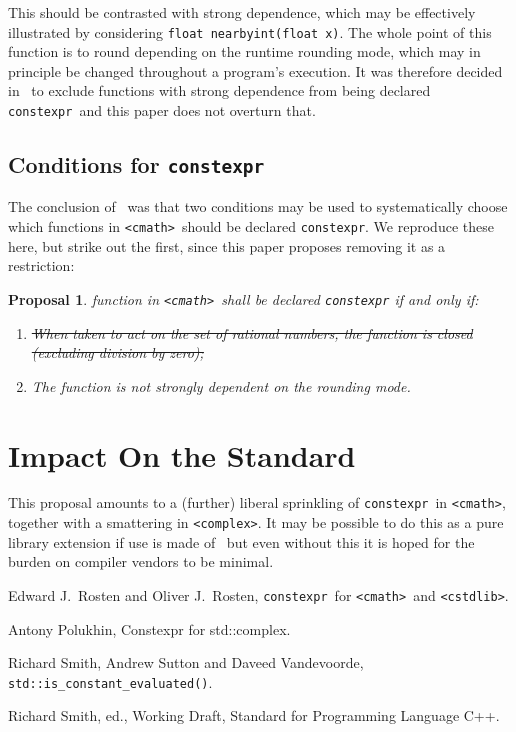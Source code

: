 \documentclass[prd,twocolumn,amsmath,amssymb,nofootinbib,eqsecnum]{revtex4-1}
\newcommand{\constexpr}{\code{constexpr}\xspace}
\newcommand{\code}[1]{{\tt #1}}
\newcommand{\header}[1]{{\tt <#1>}}
\newcommand{\cmath}{\header{cmath}}
\newcommand{\complex}{\header{complex}}
\newcommand{\cstdlib}{\header{cstdlib}}
\newtheorem*{proposal*}{Proposal}
\begin{document}
This should be contrasted with strong dependence, which may be effectively illustrated by considering \code{float nearbyint(float x)}. The whole point of this function is to round depending on the runtime rounding mode, which may in principle be changed throughout a program's execution. It was therefore decided in~\cite{Rosten-constexpr} to exclude functions with strong dependence from being declared \constexpr\ and this paper does not overturn that.

\subsection{Conditions for \constexpr}

The conclusion of~\cite{Rosten-constexpr} was that two conditions may be used to systematically choose which functions in \cmath\ should be declared \constexpr. We reproduce these here, but strike out the first, since this paper proposes removing it as a restriction:

\begin{proposal*}
	function in \cmath\ shall be declared \constexpr if and only if:
	\begin{enumerate}
		\item \st{When taken to act on the set of rational numbers, the function is closed (excluding division 
		by zero);}
		
		\item The function is not strongly dependent on the rounding mode.
	\end{enumerate}
\end{proposal*}





\section{Impact On the Standard}

This proposal amounts to a (further) liberal sprinkling of \constexpr\ in \cmath, together with a smattering in \complex. It may be possible to do this as a pure library extension if use is made of~\cite{ConstEval} but even without this it is hoped for the burden on compiler vendors to be minimal.





\begin{thebibliography}{1}
	 Edward J.~Rosten and Oliver J.~Rosten, \constexpr\ for \cmath\ and \cstdlib.

	 Antony Polukhin, Constexpr for std::complex.	
	
	 Richard Smith, Andrew Sutton and Daveed Vandevoorde, \code{std\!::\!is\_constant\_evaluated()}.
	
	 Richard Smith, ed., Working Draft, Standard for Programming Language C++.	
\end{thebibliography}
\end{document}
